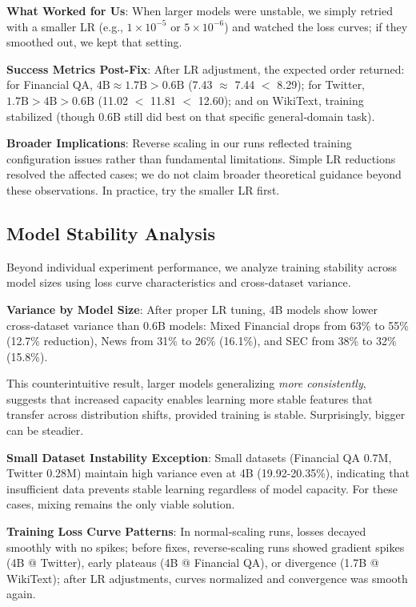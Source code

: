 \textbf{What Worked for Us}: When larger models were unstable, we simply retried with a smaller LR (e.g., $1\times10^{-5}$ or $5\times10^{-6}$) and watched the loss curves; if they smoothed out, we kept that setting.

\textbf{Success Metrics Post-Fix}: After LR adjustment, the expected order returned: for Financial QA, $4\text{B} \approx 1.7\text{B} > 0.6\text{B}$ (7.43 $\approx$ 7.44 $<$ 8.29); for Twitter, $1.7\text{B} > 4\text{B} > 0.6\text{B}$ (11.02 $<$ 11.81 $<$ 12.60); and on WikiText, training stabilized (though 0.6B still did best on that specific general‑domain task).

\textbf{Broader Implications}: Reverse scaling in our runs reflected training configuration issues rather than fundamental limitations. Simple LR reductions resolved the affected cases; we do not claim broader theoretical guidance beyond these observations. In practice, try the smaller LR first.

\subsection{Model Stability Analysis}

Beyond individual experiment performance, we analyze training stability across model sizes using loss curve characteristics and cross-dataset variance.

\textbf{Variance by Model Size}: After proper LR tuning, 4B models show lower cross‑dataset variance than 0.6B models: Mixed Financial drops from 63\% to 55\% (12.7\% reduction), News from 31\% to 26\% (16.1\%), and SEC from 38\% to 32\% (15.8\%).

This counterintuitive result, larger models generalizing \textit{more consistently}, suggests that increased capacity enables learning more stable features that transfer across distribution shifts, provided training is stable. Surprisingly, bigger can be steadier.

\textbf{Small Dataset Instability Exception}: Small datasets (Financial QA 0.7M, Twitter 0.28M) maintain high variance even at 4B (19.92-20.35\%), indicating that insufficient data prevents stable learning regardless of model capacity. For these cases, mixing remains the only viable solution.

\textbf{Training Loss Curve Patterns}: In normal‑scaling runs, losses decayed smoothly with no spikes; before fixes, reverse‑scaling runs showed gradient spikes (4B @ Twitter), early plateaus (4B @ Financial QA), or divergence (1.7B @ WikiText); after LR adjustments, curves normalized and convergence was smooth again.

